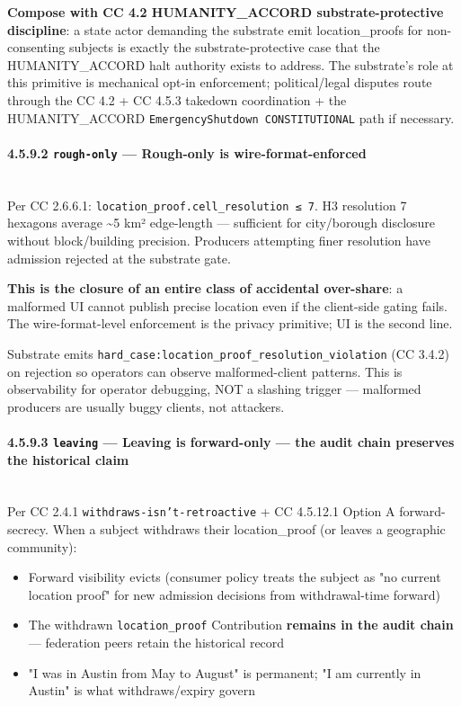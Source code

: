\documentclass[11pt]{article}
\begin{document}
\textbf{Compose with CC 4.2 HUMANITY\_ACCORD substrate-protective discipline}: a state actor demanding the substrate emit location\_proofs for non-consenting subjects is exactly the substrate-protective case that the HUMANITY\_ACCORD halt authority exists to address. The substrate's role at this primitive is mechanical opt-in enforcement; political/legal disputes route through the CC 4.2 + CC 4.5.3 takedown coordination + the HUMANITY\_ACCORD \texttt{EmergencyShutdown CONSTITUTIONAL} path if necessary.


\paragraph{4.5.9.2 \texttt{rough-only} — Rough-only is wire-format-enforced}\mbox{}\\


Per CC 2.6.6.1: \texttt{location\_proof.cell\_resolution ≤ 7}. H3 resolution 7 hexagons average \textasciitilde{}5 km² edge-length — sufficient for city/borough disclosure without block/building precision. Producers attempting finer resolution have admission rejected at the substrate gate.


\textbf{This is the closure of an entire class of accidental over-share}: a malformed UI cannot publish precise location even if the client-side gating fails. The wire-format-level enforcement is the privacy primitive; UI is the second line.


Substrate emits \texttt{hard\_case:location\_proof\_resolution\_violation} (CC 3.4.2) on rejection so operators can observe malformed-client patterns. This is observability for operator debugging, NOT a slashing trigger — malformed producers are usually buggy clients, not attackers.


\paragraph{4.5.9.3 \texttt{leaving} — Leaving is forward-only — the audit chain preserves the historical claim}\mbox{}\\


Per CC 2.4.1 \texttt{withdraws-isn't-retroactive} + CC 4.5.12.1 Option A forward-secrecy. When a subject withdraws their location\_proof (or leaves a geographic community):


\begin{itemize}\setlength\itemsep{0pt}
\item Forward visibility evicts (consumer policy treats the subject as "no current location proof" for new admission decisions from withdrawal-time forward)
\item The withdrawn \texttt{location\_proof} Contribution \textbf{remains in the audit chain} — federation peers retain the historical record
\item "I was in Austin from May to August" is permanent; "I am currently in Austin" is what withdraws/expiry govern
\end{itemize}
\end{document}
